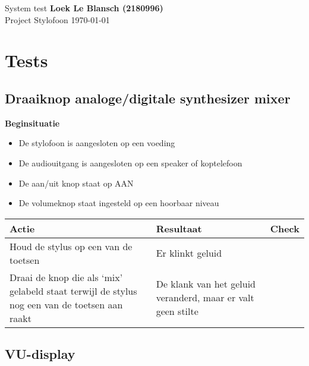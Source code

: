 \documentclass[12pt, a4paper, dutch]{article}
\newcommand{\cb}{\Square}
\newcommand{\stroom}{De stylofoon is aangesloten op een voeding}
\newcommand{\audio}{De audiouitgang is aangesloten op een speaker of koptelefoon}
\newcommand{\aan}{De aan/uit knop staat op AAN}
\newcommand{\vol}{De volumeknop staat ingesteld op een hoorbaar niveau}
\begin{document}
System test \hfill \textbf{Loek Le Blansch (2180996)}\\
Project Stylofoon \hfill \today
\medskip

\tableofcontents

\newpage
\section{Tests}

\subsection{Draaiknop analoge/digitale synthesizer mixer}

\begin{minipage}{\textwidth}
\textbf{Beginsituatie}
\begin{itemize}
	\item \stroom
	\item \audio
	\item \aan
	\item \vol
\end{itemize}

\medskip

\begin{tabularx}{\textwidth}{p{}p{}>{\raggedleft\arraybackslash}X}
\toprule
\textbf{Actie} & \textbf{Resultaat} & \textbf{Check}\\
\midrule
Houd de stylus op een van de toetsen &
Er klinkt geluid &
\cb\\

Draai de knop die als `mix' gelabeld staat terwijl de stylus nog een van de
toetsen aan raakt &
De klank van het geluid veranderd, maar er valt geen stilte &
\cb\\
\bottomrule
\end{tabularx}
\end{minipage}

\subsection{VU-display}
\end{document}
